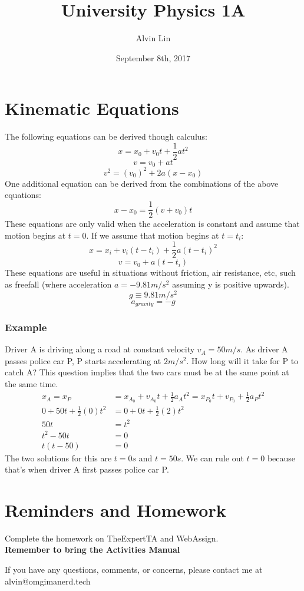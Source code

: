 \documentclass[letterpaper, 12pt]{math}
\title{University Physics 1A}
\author{Alvin Lin}
\date{September 8th, 2017}
\begin{document}
\maketitle

\section*{Kinematic Equations}
The following equations can be derived though calculus:
\[ x = x_0+v_0t+\frac{1}{2}at^2 \]
\[ v = v_0+at \]
\[ v^2 = (v_0)^2+2a(x-x_0) \]
One additional equation can be derived from the combinations of the above
equations:
\[ x-x_0 = \frac{1}{2}(v+v_0)t \]
These equations are only valid when the acceleration is constant and assume that
motion begins at \( t = 0 \). If we assume that motion begins at \( t = t_i \):
\[ x = x_i+v_i(t-t_i)+\frac{1}{2}a(t-t_i)^2 \]
\[ v = v_0+a(t-t_i) \]
These equations are useful in situations without friction, air resistance, etc,
such as freefall (where acceleration \( a = -9.81m/s^2 \) assuming y is
positive upwards).
\[ g \equiv 9.81m/s^2 \]
\[ a_{gravity} = -g \]

\subsubsection*{Example}
Driver A is driving along a road at constant velocity \( v_A = 50m/s \). As
driver A passes police car P, P starts accelerating at \( 2m/s^2 \). How long
will it take for P to catch A? This question implies that the two cars must be
at the same point at the same time.
\begin{align*}
  x_A = x_P &= x_{A_0}+v_{A_0}t+\frac{1}{2}a_At^2 =
    x_{P_0}t+v_{P_0}+\frac{1}{2}a_Pt^2 \\
  0+50t+\frac{1}{2}(0)t^2 &= 0+0t+\frac{1}{2}(2)t^2 \\
  50t &= t^2 \\
  t^2-50t &= 0 \\
  t(t-50) &= 0
\end{align*}
The two solutions for this are \( t = 0s \) and \( t = 50s \). We can rule out
\( t = 0 \) because that's when driver A first passes police car P.

\section*{Reminders and Homework}
Complete the homework on TheExpertTA and WebAssign. \\
\textbf{Remember to bring the Activities Manual}

\begin{center}
  If you have any questions, comments, or concerns, please contact me at
  alvin@omgimanerd.tech
\end{center}
\end{document}
